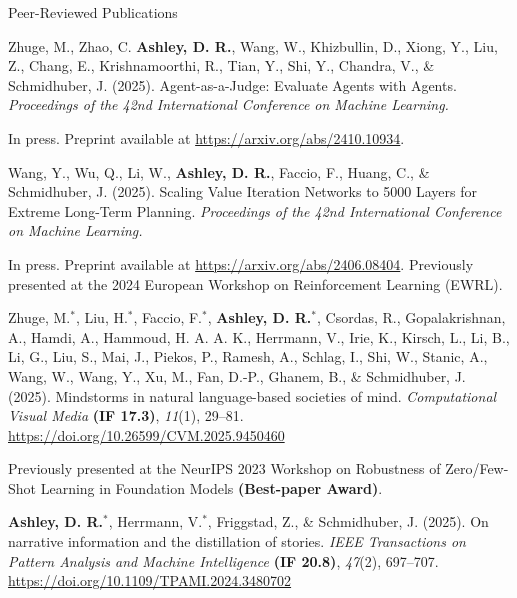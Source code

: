 \documentclass{cv}
\begin{document}
\begin{rSection}{Peer-Reviewed Publications}

\begin{rPublications}
    \item
        Zhuge, M., Zhao, C. \textbf{Ashley, D. R.}, Wang, W., Khizbullin, D., Xiong, Y., Liu, Z., Chang, E., Krishnamoorthi, R., Tian, Y., Shi, Y., Chandra, V., \& Schmidhuber, J.
        (2025).
        Agent-as-a-Judge: Evaluate Agents with Agents.
        \textit{Proceedings of the 42nd International Conference on Machine Learning.}

        \vspace{-0.4em}
        In press.
        Preprint available at \url{https://arxiv.org/abs/2410.10934}.
    \item
        Wang, Y., Wu, Q., Li, W., \textbf{Ashley, D. R.}, Faccio, F., Huang, C., \& Schmidhuber, J.
        (2025).
        Scaling Value Iteration Networks to 5000 Layers for Extreme Long-Term Planning.
        \textit{Proceedings of the 42nd International Conference on Machine Learning.}

        \vspace{-0.4em}
        In press.
        Preprint available at \url{https://arxiv.org/abs/2406.08404}.
        Previously presented at the 2024 European Workshop on Reinforcement Learning (EWRL).
    \item
        Zhuge, M.$^*$, Liu, H.$^*$, Faccio, F.$^*$, \textbf{Ashley, D. R.}$^*$, Csordas, R., Gopalakrishnan, A., Hamdi, A., Hammoud, H. A. A. K., Herrmann, V., Irie, K., Kirsch, L., Li, B., Li, G., Liu, S., Mai, J., Piekos, P., Ramesh, A., Schlag, I., Shi, W., Stanic, A., Wang, W., Wang, Y., Xu, M., Fan, D.-P., Ghanem, B., \& Schmidhuber, J.
        (2025).
        Mindstorms in natural language-based societies of mind.
        \textit{Computational Visual Media} \textbf{(IF 17.3)}, \textit{11}(1), 29--81.
        \url{https://doi.org/10.26599/CVM.2025.9450460}

        \vspace{-0.4em}
        Previously presented at the NeurIPS 2023 Workshop on Robustness of Zero/Few-Shot Learning in Foundation Models \textbf{(Best-paper Award)}.
    \item
        \textbf{Ashley, D. R.}$^*$, Herrmann, V.$^*$, Friggstad, Z., \& Schmidhuber, J.
        (2025).
        On narrative information and the distillation of stories.
        \textit{IEEE Transactions on Pattern Analysis and Machine Intelligence} \textbf{(IF 20.8)}, \textit{47}(2), 697--707.
        \url{https://doi.org/10.1109/TPAMI.2024.3480702}


\end{rPublications}
\end{rSection}
\end{document}
